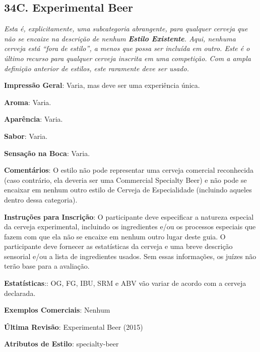 \subsection*{34C. Experimental Beer}

\textit{Esta é, explicitamente, uma subcategoria abrangente, para qualquer cerveja que não se encaixe na descrição de nenhum \textbf{Estilo Existente}. Aqui, nenhuma cerveja está “fora de estilo”, a menos que possa ser incluída em outro. Este é o último recurso para qualquer cerveja inscrita em uma competição. Com a ampla definição anterior de estilos, este raramente deve ser usado.}

\textbf{Impressão Geral}: Varia, mas deve ser uma experiência única.

\textbf{Aroma}: Varia.

\textbf{Aparência}: Varia.

\textbf{Sabor}: Varia.

\textbf{Sensação na Boca}: Varia.

\textbf{Comentários}: O estilo não pode representar uma cerveja comercial reconhecida (caso contrário, ela deveria ser uma Commercial Specialty Beer) e não pode se encaixar em nenhum outro estilo de Cerveja de Especialidade (incluindo aqueles dentro dessa categoria).

\textbf{Instruções para Inscrição}: O participante deve especificar a natureza especial da cerveja experimental, incluindo os ingredientes e/ou os processos especiais que fazem com que ela não se encaixe em nenhum outro lugar deste guia. O participante deve fornecer as estatísticas da cerveja e uma breve descrição sensorial e/ou a lista de ingredientes usados. Sem essas informações, os juízes não terão base para a avaliação.

\textbf{Estatísticas}:: OG, FG, IBU, SRM e ABV vão variar de acordo com a cerveja declarada.

\textbf{Exemplos Comerciais}: Nenhum

\textbf{Última Revisão}: Experimental Beer (2015)

\textbf{Atributos de Estilo}: specialty-beer
